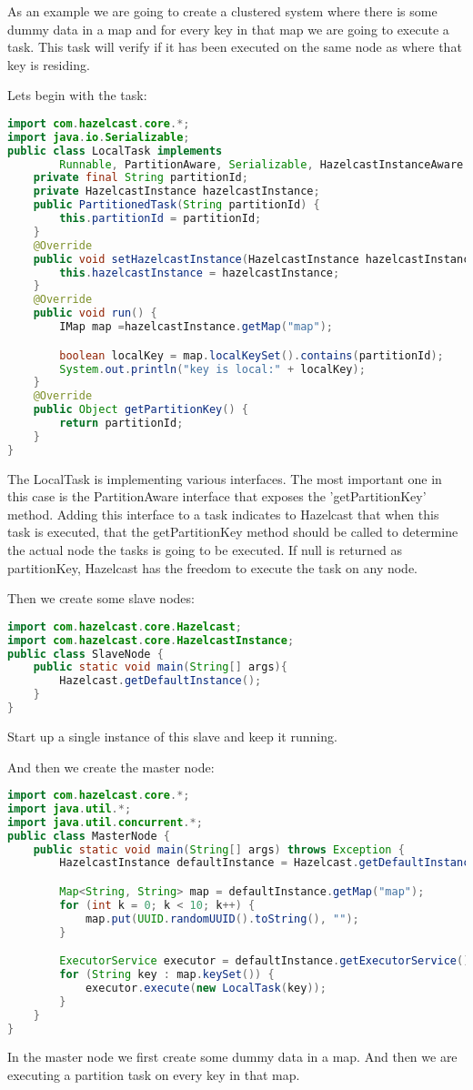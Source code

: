 As an example we are going to create a clustered system where there is some dummy data in a map and for every key in that map we are going to execute a task. This task will verify if it has been executed on the same node as where that key is residing.

Lets begin with the task:
\begin{lstlisting}[language=java]
import com.hazelcast.core.*;
import java.io.Serializable;
public class LocalTask implements
        Runnable, PartitionAware, Serializable, HazelcastInstanceAware {
    private final String partitionId;
    private HazelcastInstance hazelcastInstance;
    public PartitionedTask(String partitionId) {
        this.partitionId = partitionId;
    }
    @Override
    public void setHazelcastInstance(HazelcastInstance hazelcastInstance) {
        this.hazelcastInstance = hazelcastInstance;
    }
    @Override
    public void run() {
        IMap map =hazelcastInstance.getMap("map");

        boolean localKey = map.localKeySet().contains(partitionId);
        System.out.println("key is local:" + localKey);
    }
    @Override
    public Object getPartitionKey() {
        return partitionId;
    }
}
\end{lstlisting}
The LocalTask is implementing various interfaces. The most important one in this case is the PartitionAware interface that exposes the 'getPartitionKey' method. Adding this interface to a task indicates to Hazelcast that when this task is executed, that the getPartitionKey method should be called to determine the actual node the tasks is going to be executed. If null is returned as partitionKey, Hazelcast has the freedom to execute the task on any node.

Then we create some slave nodes:
\begin{lstlisting}[language=java]
import com.hazelcast.core.Hazelcast;
import com.hazelcast.core.HazelcastInstance;
public class SlaveNode {
    public static void main(String[] args){
        Hazelcast.getDefaultInstance();
    }
}
\end{lstlisting}
Start up a single instance of this slave and keep it running.

And then we create the master node:
\begin{lstlisting}[language=java]
import com.hazelcast.core.*;
import java.util.*;
import java.util.concurrent.*;
public class MasterNode {
    public static void main(String[] args) throws Exception {
        HazelcastInstance defaultInstance = Hazelcast.getDefaultInstance();

        Map<String, String> map = defaultInstance.getMap("map");
        for (int k = 0; k < 10; k++) {
            map.put(UUID.randomUUID().toString(), "");
        }

        ExecutorService executor = defaultInstance.getExecutorService();
        for (String key : map.keySet()) {
            executor.execute(new LocalTask(key));
        }
    }
}
\end{lstlisting}
In the master node we first create some dummy data in a map. And then we are
executing a partition task on every key in that map. 

